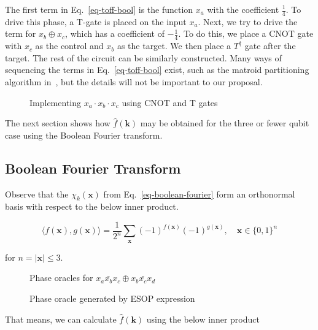 \begin{example}
  The first term in Eq.~\ref{eq-toff-bool} is the function $x_a$ with the coefficient
  $\frac{1}{4}$. To drive this phase, a T-gate is placed on the input $x_a$. Next, we try to
  drive the term for $x_b \oplus x_c$, which has a coefficient of $-\frac{1}{4}$. To do
  this, we place a CNOT gate with $x_c$ as the control and $x_b$ as the target. We then
  place a $T^{\dagger}$ gate after the target. The rest of the circuit can be similarly
  constructed. Many ways of sequencing the terms in Eq.~\ref{eq-toff-bool} exist, such as
  the matroid partitioning algorithm in~\cite{bib-amy-matroid}, but the details will not be
  important to our proposal.
\end{example}

\begin{figure}[t]
  \centering
  \scalebox{0.7} {
    
  }
  \caption{Implementing $x_a \cdot x_b \cdot x_c$ using CNOT and T gates}
  \label{fig-toff-mark-matroid}
\end{figure}

The next section shows how $\hat{f}(\mathbf{k})$ may be obtained for the three or fewer
qubit case using the Boolean Fourier transform.

\subsection{Boolean Fourier Transform}
\label{Pre:Four}
Observe that the $\chi_k(\mathbf{x})$ from Eq.~\ref{eq-boolean-fourier} form an orthonormal basis with respect
to the below inner product.

\begin{equation}
  \label{eq-inner-prod}
  \langle f(\mathbf{x}) , g(\mathbf{x}) \rangle = \frac{1}{2^n} \sum_{\mathbf{x}} (-1)^{f(\mathbf{x})} (-1)^{g(\mathbf{x})}, \quad \mathbf{x} \in \{0,1\}^n
\end{equation}

for $n = |\mathbf{x}| \leq 3$.

\begin{figure}[t]
  \centering
  \begin{minipage}{\textwidth}
    \centering
    \scalebox{0.9} {
      
    }
    \label{fig-series-4inp-inv}
  \end{minipage}
  \begin{minipage}{\textwidth}
    \centering
    \scalebox{0.9} {
      
    }
    \label{fig-series-4inp}
  \end{minipage}
  \caption{Phase oracles for $x_a \bar{x_b} x_c \oplus x_b \bar{x_c} x_d$}
  \label{fig-series-all}
\end{figure}
\begin{figure}[t]
  \centering
  \scalebox{1.0} {
    
  }
  \caption{Phase oracle generated by ESOP expression}
  \label{fig-series-4inp-mct}
\end{figure}
That means, we can calculate $\hat{f}(\mathbf{k})$ using the below inner product

